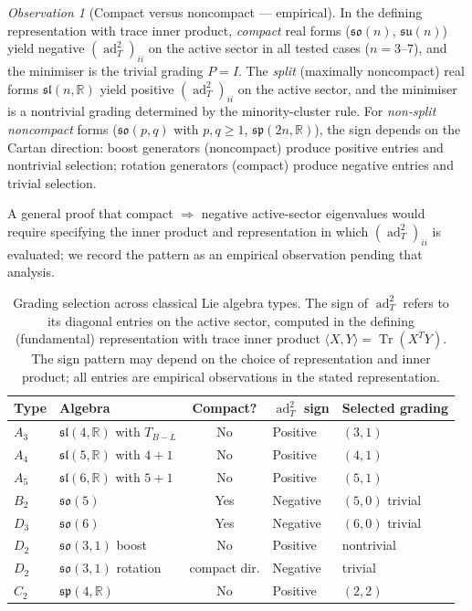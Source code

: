 \documentclass[11pt]{article}
\theoremstyle{plain}
\theoremstyle{definition}
\theoremstyle{remark}
\newtheorem*{observation}{Observation}
\newcommand{\sln}[1]{\mathfrak{sl}(#1,\mathbb{R})}
\newcommand{\TBL}{T_{B\!-\!L}}
\newcommand{\ad}{\operatorname{ad}}
\newcommand{\Tr}{\operatorname{Tr}}
\begin{document}
\begin{observation}[Compact versus noncompact --- empirical]
\label{obs:compact}
In the defining representation with trace inner product,
\emph{compact} real forms ($\mathfrak{so}(n)$, $\mathfrak{su}(n)$)
yield negative $(\ad_T^2)_{ii}$ on the active sector in all tested
cases ($n = 3$--$7$), and the minimiser is the trivial grading
$P = I$.  The \emph{split} (maximally noncompact) real forms
$\sln{n}$ yield positive $(\ad_T^2)_{ii}$ on the active sector,
and the minimiser is a nontrivial grading determined by the
minority-cluster rule.  For \emph{non-split noncompact} forms
($\mathfrak{so}(p,q)$ with $p, q \ge 1$,
$\mathfrak{sp}(2n,\mathbb{R})$), the sign depends on the Cartan
direction: boost generators (noncompact) produce positive entries
and nontrivial selection; rotation generators (compact) produce
negative entries and trivial selection.

A general proof that compact $\Rightarrow$ negative active-sector
eigenvalues would require specifying the inner product and
representation in which $(\ad_T^2)_{ii}$ is evaluated; we record
the pattern as an empirical observation pending that analysis.
\end{observation}

\begin{table}[h]
\centering\small
\begin{tabular}{@{}llcll@{}}
\toprule
Type & Algebra & Compact? & $\ad_T^2$ sign & Selected grading \\
\midrule
$A_3$ & $\sln{4}$ with $\TBL$ & No & Positive & $(3,1)$ \\
$A_4$ & $\sln{5}$ with $4{+}1$ & No & Positive & $(4,1)$ \\
$A_5$ & $\sln{6}$ with $5{+}1$ & No & Positive & $(5,1)$ \\
$B_2$ & $\mathfrak{so}(5)$ & Yes & Negative & $(5,0)$ trivial \\
$D_3$ & $\mathfrak{so}(6)$ & Yes & Negative & $(6,0)$ trivial \\
$D_2$ & $\mathfrak{so}(3,1)$ boost & No & Positive & nontrivial \\
$D_2$ & $\mathfrak{so}(3,1)$ rotation & compact dir. & Negative & trivial \\
$C_2$ & $\mathfrak{sp}(4,\mathbb{R})$ & No & Positive & $(2,2)$ \\
\bottomrule
\end{tabular}
\caption{Grading selection across classical Lie algebra types.
The sign of $\ad_T^2$ refers to its diagonal entries on the active
sector, computed in the defining (fundamental) representation with
trace inner product $\langle X, Y \rangle = \Tr(X^T Y)$.  The sign
pattern may depend on the choice of representation and inner product;
all entries are empirical observations in the stated representation.}
\label{tab:cross-type}
\end{table}
\end{document}
